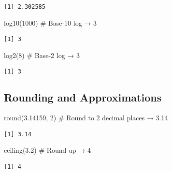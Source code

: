 \documentclass[
  letterpaper,
  DIV=11,
  numbers=noendperiod]{scrreprt}
\newenvironment{Shaded}{\begin{snugshade}}{\end{snugshade}}
\newcommand{\CommentTok}[1]{\textcolor[rgb]{0.37,0.37,0.37}{#1}}
\newcommand{\DecValTok}[1]{\textcolor[rgb]{0.68,0.00,0.00}{#1}}
\newcommand{\FloatTok}[1]{\textcolor[rgb]{0.68,0.00,0.00}{#1}}
\newcommand{\FunctionTok}[1]{\textcolor[rgb]{0.28,0.35,0.67}{#1}}
\newcommand{\NormalTok}[1]{\textcolor[rgb]{0.00,0.23,0.31}{#1}}
\begin{document}
\begin{verbatim}
[1] 2.302585
\end{verbatim}

\begin{Shaded}
\begin{Highlighting}[]
\FunctionTok{log10}\NormalTok{(}\DecValTok{1000}\NormalTok{)            }\CommentTok{\# Base{-}10 log → 3}
\end{Highlighting}
\end{Shaded}

\begin{verbatim}
[1] 3
\end{verbatim}

\begin{Shaded}
\begin{Highlighting}[]
\FunctionTok{log2}\NormalTok{(}\DecValTok{8}\NormalTok{)                }\CommentTok{\# Base{-}2 log → 3}
\end{Highlighting}
\end{Shaded}

\begin{verbatim}
[1] 3
\end{verbatim}

\subsection{Rounding and
Approximations}\label{rounding-and-approximations}

\begin{Shaded}
\begin{Highlighting}[]
\FunctionTok{round}\NormalTok{(}\FloatTok{3.14159}\NormalTok{, }\DecValTok{2}\NormalTok{)      }\CommentTok{\# Round to 2 decimal places → 3.14}
\end{Highlighting}
\end{Shaded}

\begin{verbatim}
[1] 3.14
\end{verbatim}

\begin{Shaded}
\begin{Highlighting}[]
\FunctionTok{ceiling}\NormalTok{(}\FloatTok{3.2}\NormalTok{)           }\CommentTok{\# Round up → 4}
\end{Highlighting}
\end{Shaded}

\begin{verbatim}
[1] 4
\end{verbatim}
\end{document}

